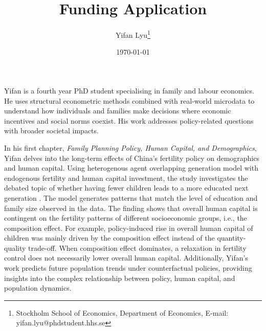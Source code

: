 \documentclass[12pt, letterpaper]{article}
\begin{document}
\providecommand{\titlename}{Funding Application}
\title{\titlename}
\author{
    {Yifan Lyu\thanks{Stockholm School of Economics, Department of Economics, E-mail: \textcolor{brickred}{yifan.lyu@phdstudent.hhs.se}}
    }
}
\date{\monthyeardate\today}
\maketitle %

\vspace{-0.5cm}


Yifan is a fourth year PhD student specialising in family and labour economics. He uses structural econometric methods combined with real-world microdata to understand how individuals and families make decisions where economic incentives and social norms coexist. His work addresses policy-related questions with broader societal impacts.



In his first chapter, \textit{Family Planning Policy, Human Capital, and Demographics}, Yifan delves into the long-term effects of China's fertility policy on demographics and human capital. Using heterogenous agent overlapping generation model with endogenous fertility and human capital investment, the study investigates the debated topic of whether having fewer children leads to a more educated next generation \citep{Zhang2017}. The model generates patterns that match the level of education and family size observed in the data. The finding shows that overall human capital is contingent on the fertility patterns of different socioeconomic groups, i.e., the composition effect. For example, policy-induced rise in overall human capital of children was mainly driven by the composition effect instead of the quantity-quality trade-off. When composition effect dominates, a relaxation in fertility control does not necessarily lower overall human capital. Additionally, Yifan's work predicts future population trends under counterfactual policies, providing insights into the complex relationship between policy, human capital, and population dynamics.
\end{document}
